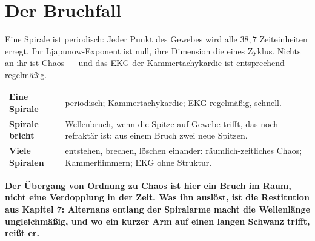\section{Der Bruchfall}

\begin{warnung}
Eine Spirale ist periodisch: Jeder Punkt des Gewebes wird alle $38{,}7$ Zeiteinheiten erregt. Ihr Ljapunow-Exponent ist null, ihre Dimension die eines Zyklus. Nichts an ihr ist Chaos --- und das EKG der Kammertachykardie ist entsprechend regelmäßig.

\begin{center}
{\small
\renewcommand{\arraystretch}{1.5}
\begin{tabular}{@{}P{2.8cm}P{6.0cm}@{}}
\toprule
\textbf{Eine Spirale} & periodisch; Kammertachykardie; EKG regelmäßig, schnell.\\
\textbf{Spirale bricht} & Wellenbruch, wenn die Spitze auf Gewebe trifft, das noch refraktär ist; aus einem Bruch zwei neue Spitzen.\\
\textbf{Viele Spiralen} & entstehen, brechen, löschen einander: räumlich-zeitliches Chaos; Kammerflimmern; EKG ohne Struktur.\\
\bottomrule
\end{tabular}}
\end{center}

\begin{center}
\begin{minipage}{0.9\textwidth}
\textbf{Der Übergang von Ordnung zu Chaos ist hier ein Bruch im Raum, nicht eine Verdopplung in der Zeit. Was ihn auslöst, ist die Restitution aus Kapitel 7: Alternans entlang der Spiralarme macht die Wellenlänge ungleichmäßig, und wo ein kurzer Arm auf einen langen Schwanz trifft, reißt er.}
\end{minipage}
\end{center}

\begin{center}
\begin{minipage}{0.88\textwidth}
\end{minipage}
\end{center}
\end{warnung}

